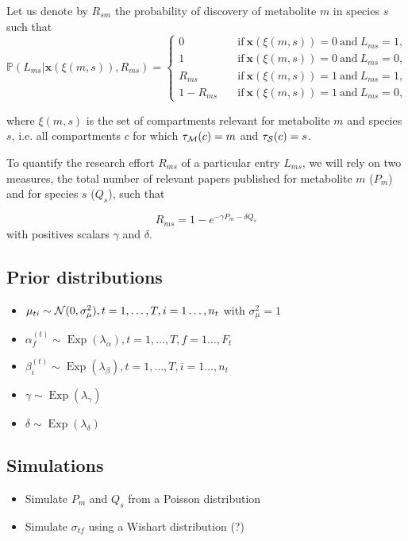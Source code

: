 \documentclass[a4paper,10pt]{article}
\DeclareMathOperator{\Exp}{Exp}
\def\P{\mathbb{P}}
\def\x{\boldsymbol{x}}
\def\N{{\cal N}}
\def\M{{\cal M}}
\def\S{{\cal S}}
\begin{document}
 Let us denote by $R_{sm}$ the probability of discovery of metabolite $m$ in species $s$ such that
 \begin{equation*}
  \P(L_{ms}|\x(\xi(m,s)), R_{ms}) = \begin{cases}
                             0 \quad &\mathrm{if\ } \x(\xi(m,s))=0 \mathrm{\ and\ } L_{ms} = 1,\\
                             1 \quad &\mathrm{if\ } \x(\xi(m,s))=0 \mathrm{\ and\ } L_{ms} = 0,\\
                             R_{ms} \quad &\mathrm{if\ } \x(\xi(m,s))=1 \mathrm{\ and\ } L_{ms} = 1,\\
                             1- R_{ms} \quad &\mathrm{if\ } \x(\xi(m,s))=1 \mathrm{\ and\ } L_{ms} = 0,
                            \end{cases}
 \end{equation*}

 where $\xi(m,s)$ is the set of compartments relevant for metabolite $m$ and species $s$, i.e. all compartments $c$ for which $\tau_\M(c)=m$ and $\tau_\S(c)=s$.

 To quantify the research effort $R_{ms}$ of a particular entry $L_{ms}$, we will rely on two measures, the total number of relevant papers published for metabolite $m$ ($P_m$) and for species $s$ ($Q_s$), such that

 \begin{equation*}
 R_{ms} = 1 - e^{-\gamma P_m - \delta Q_s}
 \end{equation*}
with positives scalars $\gamma$ and $\delta$.


\subsection{Prior distributions}

\begin{itemize}
 \item $\mu_{ti} \sim \N(0, \sigma^2_\mu), t=1, \ldots, T, i=1\ldots, n_t$ with $\sigma^2_\mu=1$
 \item $\alpha^{(t)}_f \sim \Exp(\lambda_\alpha), t=1, \ldots, T, f=1\ldots, F_t$
 \item $\beta^{(t)}_i \sim \Exp(\lambda_\beta), t=1, \ldots, T, i=1\ldots, n_t$
 \item $\gamma \sim \Exp(\lambda_\gamma)$
 \item $\delta \sim \Exp(\lambda_\delta)$
\end{itemize}


\subsection{Simulations}

\begin{itemize}
 \item Simulate $P_m$ and $Q_s$ from a Poisson distribution
 \item Simulate $\sigma_{tf}$ using a Wishart distribution (?)
\end{itemize}





\end{document}
